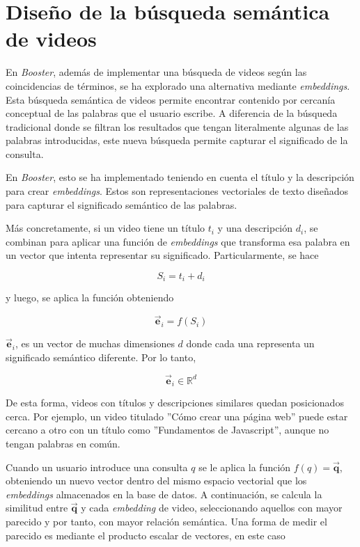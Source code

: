\section{Diseño de la búsqueda semántica de videos}

En \textit{Booster}, además de implementar una búsqueda de videos según las coincidencias de términos, se ha explorado una alternativa mediante \textit{embeddings}. Esta búsqueda semántica de videos permite encontrar contenido por cercanía conceptual de las palabras que el usuario escribe. A diferencia de la búsqueda tradicional donde se filtran los resultados que tengan literalmente algunas de las palabras introducidas, este nueva búsqueda permite capturar el significado de la consulta. 

En \textit{Booster}, esto se ha implementado teniendo en cuenta el título y la descripción para crear \textit{embeddings}. Estos son representaciones vectoriales de texto diseñados para capturar el significado semántico de las palabras.  

Más concretamente, si un video tiene un título $t_i$ y una descripción $d_i$, se combinan para aplicar una función de \textit{embeddings} que transforma esa palabra en un vector que intenta representar su significado. Particularmente, se hace 

\begin{equation}
    S_i = t_i + d_i  
\end{equation}

y luego, se aplica la función obteniendo

\begin{equation}
    \vec{\mathbf{e}}_i = f(S_i)
\end{equation}

$ \vec{\mathbf{e}}_i$, es un vector de muchas dimensiones $d$ donde cada una representa un significado semántico diferente. Por lo tanto, 

\begin{equation}
     \vec{\mathbf{e}}_i \in \mathbb{R}^d 
\end{equation}

De esta forma, videos con títulos y descripciones similares quedan posicionados cerca. Por ejemplo, un video titulado ''Cómo crear una página web'' puede estar cercano a otro con un título como ''Fundamentos de Javascript'', aunque no tengan palabras en común. 

Cuando un usuario introduce una consulta $q$ se le aplica la función $ f(q) = \vec{\mathbf{q}}$, obteniendo un nuevo vector dentro del mismo espacio vectorial que los \textit{embeddings} almacenados en la base de datos. A continuación, se calcula la similitud entre $\vec{\mathbf{q}}$ y cada \textit{embedding} de video, seleccionando aquellos con mayor parecido y por tanto, con  mayor relación semántica. Una forma de medir el parecido es mediante el producto escalar de vectores, en este caso

